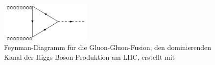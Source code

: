  \begin{figure}[tbp]
  \begin{center}
    \includegraphics[width=0.4\textwidth]{graphics/gluonfusion.png}
    \parbox[b]{12cm}{
      \caption[Gluon-Gluon-Fusion Feynman-Diagramm]
             {\label{fig:gluonfusion}\!Feynman-Diagramm f\"ur die Gluon-Gluon-Fusion, den dominierenden Kanal der Higgs-Boson-Produktion am LHC, erstellt mit \cite{feynman_draw}}
    }
  \end{center}
 \end{figure}